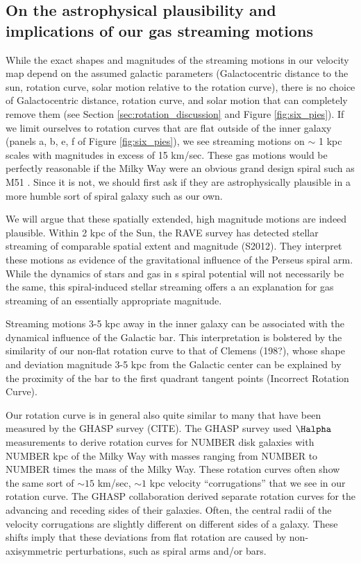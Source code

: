 \subsection{On the astrophysical plausibility and implications of our gas streaming motions}
\label{sec:discussion-plausibility}
While the exact shapes and magnitudes of the streaming motions in our velocity map depend on the assumed galactic parameters (Galactocentric distance to the sun, rotation curve, solar motion relative to the rotation curve), there is no choice of Galactocentric distance, rotation curve, and solar motion that can completely remove them (see Section \ref{sec:rotation_discussion} and Figure \ref{fig:six_pies}).
If we limit ourselves to rotation curves that are flat outside of the inner galaxy (panels a, b, e, f of Figure \ref{fig:six_pies}), we see streaming motions on $\sim$ 1 kpc scales with magnitudes in excess of 15 km/sec. 
These gas motions would be perfectly reasonable if the Milky Way were an obvious grand design spiral such as M51 \citep{Meidt_2013}. 
Since it is not, we should first ask if they are astrophysically plausible in a more humble sort of spiral galaxy such as our own. 

We will argue that these spatially extended, high magnitude motions are indeed plausible.
Within 2 kpc of the Sun, the RAVE survey has detected stellar streaming of comparable spatial extent and magnitude (S2012). They interpret these motions as evidence of the gravitational influence of the Perseus spiral arm.
While the dynamics of stars and gas in s spiral potential will not necessarily be the same, this spiral-induced stellar streaming offers a an explanation for gas streaming of an essentially appropriate magnitude.

Streaming motions 3-5 kpc away in the inner galaxy can be associated with the dynamical influence of the Galactic bar. 
This interpretation is bolstered by the similarity of our non-flat rotation curve to that of Clemens (198?), whose shape and deviation magnitude 3-5 kpc from the Galactic center can be explained by the proximity of the bar to the first quadrant tangent points (Incorrect Rotation Curve). 

Our rotation curve is in general also quite similar to many that have been measured by the GHASP survey (CITE). 
The GHASP survey used $\Halpha$ measurements to derive rotation curves for NUMBER disk galaxies with NUMBER kpc of the Milky Way with masses ranging from NUMBER to NUMBER times the mass of the Milky Way.
These rotation curves often show the same sort of $\sim 15$ km/sec, $\sim 1$ kpc velocity ``corrugations'' that we see in our rotation curve. 
The GHASP collaboration derived separate rotation curves for the advancing and receding sides of their galaxies.
Often, the central radii of the velocity corrugations are slightly different on different sides of a galaxy.
These shifts imply that these deviations from flat rotation are caused by non-axisymmetric perturbations, such as spiral arms and/or bars.

